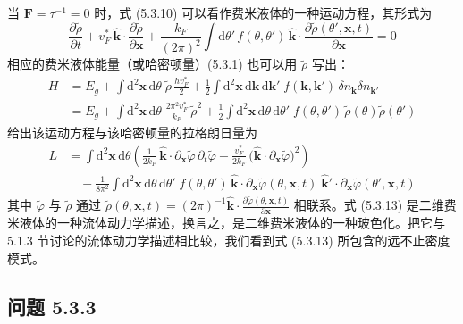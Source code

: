 当 $\pmb{F} = \tau^{-1} = 0$ 时，式 (5.3.10) 可以看作费米液体的一种运动方程，其形式为
\begin{equation*}
\frac{\partial \tilde{\rho}}{\partial t} + v^{*}_F\, \hat{\pmb{k}} \cdot \frac{\partial \tilde{\rho}}{\partial \pmb{x}} + \frac{k_F}{(2\pi)^{2}} \int \mathrm{d}\theta'\, f(\theta,\theta')\, \hat{\pmb{k}} \cdot \frac{\partial \tilde{\rho}(\theta',\pmb{x},t)}{\partial \pmb{x}} = 0 \tag{5.3.11}
\end{equation*}
相应的费米液体能量（或哈密顿量）(5.3.1) 也可以用 $\tilde{\rho}$ 写出：
\begin{align*}
H &= E_g + \int \mathrm{d}^{2}\pmb{x}\,\mathrm{d}\theta\; \tilde{\rho}\, \frac{h v^{*}_F}{2} + \frac{1}{2} \int \mathrm{d}^{2}\pmb{x}\,\mathrm{d}\pmb{k}\,\mathrm{d}\pmb{k}'\; f(\pmb{k},\pmb{k}')\, \delta n_{\pmb{k}} \delta n_{\pmb{k}'}\\
&= E_g + \int \mathrm{d}^{2}\pmb{x}\,\mathrm{d}\theta\; \frac{2\pi^{2} v^{*}_F}{k_F}\, \tilde{\rho}^{2} + \frac{1}{2} \int \mathrm{d}^{2}\pmb{x}\,\mathrm{d}\theta\,\mathrm{d}\theta'\; f(\theta,\theta')\, \tilde{\rho}(\theta) \tilde{\rho}(\theta') \tag{5.3.12}
\end{align*}
给出该运动方程与该哈密顿量的拉格朗日量为
\begin{align*}
L &= \int \mathrm{d}^{2}\pmb{x}\,\mathrm{d}\theta \left( \frac{1}{2k_F}\, \hat{\pmb{k}} \cdot \partial_{\pmb{x}} \tilde{\varphi}\, \partial_t \tilde{\varphi} - \frac{v^{*}_F}{2k_F}\, \big( \hat{\pmb{k}} \cdot \partial_{\pmb{x}} \tilde{\varphi} \big)^{2} \right)\\
&\quad - \frac{1}{8\pi^{2}} \int \mathrm{d}^{2}\pmb{x}\,\mathrm{d}\theta\,\mathrm{d}\theta'\; f(\theta,\theta')\, \hat{\pmb{k}} \cdot \partial_{\pmb{x}} \tilde{\varphi}(\theta,\pmb{x},t)\; \hat{\pmb{k}}' \cdot \partial_{\pmb{x}} \tilde{\varphi}(\theta',\pmb{x},t) \tag{5.3.13}
\end{align*}
其中 $\tilde{\varphi}$ 与 $\tilde{\rho}$ 通过 $\tilde{\rho}(\theta,\pmb{x},t) = (2\pi)^{-1} \hat{\pmb{k}} \cdot \frac{\partial \tilde{\varphi}(\theta,\pmb{x},t)}{\partial \pmb{x}}$ 相联系。式 (5.3.13) 是二维费米液体的一种流体动力学描述，换言之，是二维费米液体的一种玻色化。把它与 5.1.3 节讨论的流体动力学描述相比较，我们看到式 (5.3.13) 所包含的远不止密度模式。

\subsection*{问题 5.3.3}

